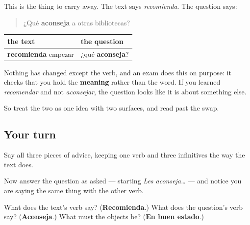 \begin{grammarlens}[title={Grammar Lens: the question will not use the paragraph's verb}]
This is the thing to carry away. The text says \emph{recomienda}. The question says:

\begin{quote}
¿Qué \textbf{aconseja} a otras bibliotecas?
\end{quote}

\noindent
\begin{tabularx}{\linewidth}{@{}>{\raggedright\arraybackslash}X>{\raggedright\arraybackslash}X@{}}
\toprule
\textbf{the text} & \textbf{the question} \\
\midrule
\textbf{recomienda} empezar & ¿qué \textbf{aconseja}? \\
\bottomrule
\end{tabularx}

Nothing has changed except the verb, and an exam does this on purpose: it checks that you hold the \textbf{meaning} rather than the word. If you learned \emph{recomendar} and not \emph{aconsejar}, the question looks like it is about something else.

So treat the two as one idea with two surfaces, and read past the swap.
\end{grammarlens}

\subsection*{Your turn}
Say all three pieces of advice, keeping one verb and three infinitives the way the text does.

Now answer the question as asked — starting \emph{Les aconseja…} — and notice you are saying the same thing with the other verb.

\begin{tcolorbox}[breakable,colback=teal!4,colframe=teal!35!black,title={Before you move on}]
What does the text's verb say? (\textbf{Recomienda}.) What does the question's verb say? (\textbf{Aconseja}.) What must the objects be? (\textbf{En buen estado}.)
\end{tcolorbox}
